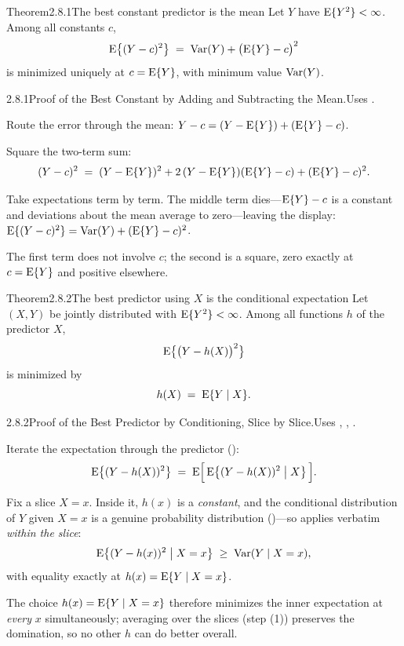 \documentclass[main.tex]{subfiles}
\begin{document}
\begin{Obj}{Theorem}{2.8.1}{The best constant predictor is the mean}
Let $Y$ have $\mathrm{E}\{Y^2\}<\infty$. Among all constants $c$,
\[ \mathrm{E}\big\{(Y-c)^2\big\} \;=\; \operatorname{Var}(Y) + \big(\mathrm{E}\{Y\}-c\big)^2 \]
is minimized uniquely at $c=\mathrm{E}\{Y\}$, with minimum value $\operatorname{Var}(Y)$.
\end{Obj}
\begin{Prf}{2.8.1}{Proof of the Best Constant by Adding and Subtracting the Mean.}{Uses .}
\item Route the error through the mean: $Y-c=(Y-\mathrm{E}\{Y\})+(\mathrm{E}\{Y\}-c)$.
\item Square the two-term sum:
      \[ (Y-c)^2 \;=\; (Y-\mathrm{E}\{Y\})^2 + 2\,(Y-\mathrm{E}\{Y\})(\mathrm{E}\{Y\}-c) + (\mathrm{E}\{Y\}-c)^2 . \]
\item Take expectations term by term. The middle term dies---$\mathrm{E}\{Y\}-c$ is a constant and
      deviations about the mean average to zero---leaving the display:
      $\mathrm{E}\{(Y-c)^2\}=\operatorname{Var}(Y)+(\mathrm{E}\{Y\}-c)^2$.
\item The first term does not involve $c$; the second is a square, zero exactly at
      $c=\mathrm{E}\{Y\}$ and positive elsewhere.
\end{Prf}

\begin{Obj}{Theorem}{2.8.2}{The best predictor using $X$ is the conditional expectation}
Let $(X,Y)$ be jointly distributed with $\mathrm{E}\{Y^2\}<\infty$. Among all functions $h$ of the
predictor $X$,
\[ \mathrm{E}\big\{ \big(Y-h(X)\big)^2 \big\} \]
is minimized by
\[ h(X) \;=\; \mathrm{E}\{Y\mid X\} . \]
\end{Obj}
\begin{Prf}{2.8.2}{Proof of the Best Predictor by Conditioning, Slice by Slice.}{Uses , , .}
\item Iterate the expectation through the predictor ():
      \[ \mathrm{E}\big\{(Y-h(X))^2\big\}
         \;=\; \mathrm{E}\Big[\, \mathrm{E}\big\{ (Y-h(X))^2 \bigm| X \big\} \,\Big] . \]
\item Fix a slice $X=x$. Inside it, $h(x)$ is a \emph{constant}, and the conditional
      distribution of $Y$ given $X=x$ is a genuine probability distribution
      ()---so  applies verbatim \emph{within the slice}:
      \[ \mathrm{E}\big\{ (Y-h(x))^2 \bigm| X=x \big\}
         \;\ge\; \operatorname{Var}(Y\mid X=x) , \]
      with equality exactly at $h(x)=\mathrm{E}\{Y\mid X=x\}$.
\item The choice $h(x)=\mathrm{E}\{Y\mid X=x\}$ therefore minimizes the inner expectation at
      \emph{every} $x$ simultaneously; averaging over the slices (step (1)) preserves the
      domination, so no other $h$ can do better overall.
\end{Prf}
\end{document}
